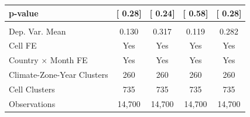 {\begin{tabular}{l*{4}{c}}
\hspace{15pt} p-value&[     0.28]         &[     0.24]         &[     0.58]         &[     0.28]         \\
\hline \\ Dep. Var. Mean& 0.130         & 0.317         & 0.119         & 0.282         \\
Cell FE             &   Yes         &   Yes         &   Yes         &   Yes         \\
Country $\times$ Month FE&   Yes         &   Yes         &   Yes         &   Yes         \\
Climate-Zone-Year Clusters&   260         &   260         &   260         &   260         \\
Cell Clusters       &   735         &   735         &   735         &   735         \\
Observations        &14,700         &14,700         &14,700         &14,700         \\
\bottomrule
\end{tabular}
}
